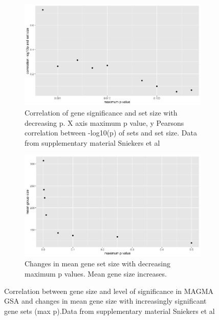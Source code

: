 \begin{figure}
  \begin{subfigure}{15cm}
    \centering\includegraphics[width=12cm]{images/chapter2/ggplot/Rplot_corr_log10_set_p.png}
    \caption{Correlation of gene significance and set size with decreasing p. X axis maximum p value, y Pearsons correlation between -log10(p) of sets and set size. Data from supplementary material Sniekers et al\cite{sniekers2017genome}}
    \label{fig:correlation gene significance and set size Sniekers}
    \end{subfigure}
    
  \begin{subfigure}{15cm}
    \centering\includegraphics[width=12cm]{images/chapter2/ggplot/Rplot_minimum_p_mean_group_sizes.png}
    \caption{Changes in mean gene set size with decreasing maximum p values. Mean gene size increases. }
  \end{subfigure}
  \caption{Correlation between gene size and level of significance in MAGMA GSA and changes in mean gene size with increasingly significant gene sets (max p).Data from supplementary material Sniekers et al\cite{sniekers2017genome}}
   \label{fig:correlation gene significance and set size Sniekers with changes mean gene}
  \end{figure}


